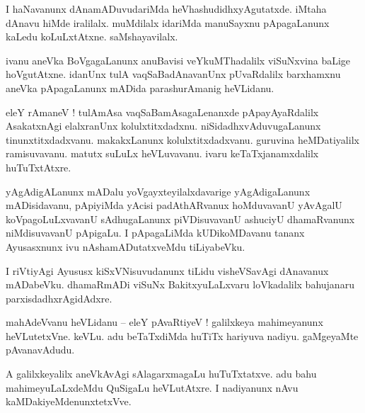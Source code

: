 \documentclass{article}
\begin{document}
\begin{mn}%
I haNavanunx dAnamADuvudariMda heVhashudidhxyAgutatxde. iMtaha dAnavu hiMde iralilalx. muMdilalx 
idariMda manuSayxnu pApagaLanunx kaLedu koLuLxtAtxne. saMshayavilalx.
\end{mn}

\begin{mn}%
ivanu aneVka BoVgagaLanunx anuBavisi veYkuMThadalilx viSuNxvina baLige hoVgutAtxne. idanUnx tulA 
vaqSaBadAnavanUnx pUvaRdalilx barxhamxnu aneVka pApagaLanunx mADida parashurAmanig heVLidanu.
\end{mn}

\begin{mn}%
eleY rAmaneV ! tulAmAsa vaqSaBamAsagaLenanxde pApayAyaRdalilx AsakatxnAgi elalxranUnx 
kolulxtitxdadxnu. niSidadhxvAduvugaLanunx tinunxtitxdadxvanu. makakxLanunx kolulxtitxdadxvanu. 
guruvina heMDatiyalilx ramisuvavanu. matutx suLuLx heVLuvavanu. ivaru keTaTxjanamxdalilx 
huTuTxtAtxre.
\end{mn}

\begin{mn}%
yAgAdigALanunx mADalu yoVgayxteyilalxdavarige yAgAdigaLanunx mADisidavanu, pApiyiMda yAcisi 
padAthARvanux hoMduvavanU yAvAgalU koVpagoLuLxvavanU sAdhugaLanunx piVDisuvavanU ashuciyU 
dhamaRvanunx niMdisuvavanU  pApigaLu. I pApagaLiMda kUDikoMDavanu tananx Ayusasxnunx ivu 
nAshamADutatxveMdu tiLiyabeVku.
\end{mn}

\begin{mn}%
I riVtiyAgi Ayususx kiSxVNisuvudanunx tiLidu visheVSavAgi dAnavanux mADabeVku. dhamaRmADi viSuNx 
BakitxyuLaLxvaru loVkadalilx bahujanaru parxisdadhxrAgidAdxre.
\end{mn}


\begin{mn}%
mahAdeVvanu heVLidanu -- eleY pAvaRtiyeV ! galilxkeya mahimeyanunx heVLutetxVne. keVLu. adu 
beTaTxdiMda huTiTx hariyuva nadiyu. gaMgeyaMte pAvanavAdudu.
\end{mn}

\begin{mn}%
A galilxkeyalilx aneVkAvAgi sAlagarxmagaLu huTuTxtatxve. adu bahu mahimeyuLaLxdeMdu QuSigaLu 
heVLutAtxre. I nadiyanunx nAvu kaMDakiyeMdenunxtetxVve.
\end{mn}
\end{document}
